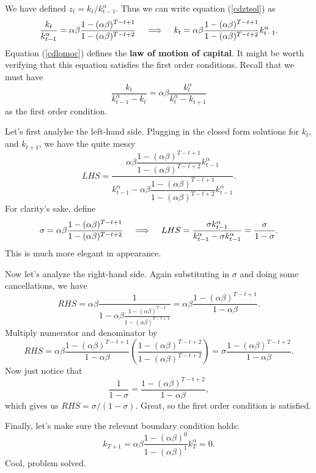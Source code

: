 \documentclass[12pt]{article}
\newcommand{\Lindent}{\hspace{.4cm} \Longrightarrow \hspace{.4cm}}
\theoremstyle{definition}
\begin{document}
We have defined $z_t = k_t / k^{\alpha}_{t-1}$.  Thus we can write equation (\ref{cdztsol}) as 
\begin{equation}
	\frac{k_t}{k^{\alpha}_{t-1}} = 	\alpha \beta\frac{ 1 - (\alpha \beta)^{T -t +1}}{ 1 - (\alpha \beta)^{T -t +2}} \Lindent k_t = \alpha \beta \frac{ 1 - (\alpha \beta)^{T -t +1}}{ 1 - (\alpha \beta)^{T -t +2}}k^{\alpha}_{t-1}. \label{cdlomoc} 
\end{equation}
Equation (\ref{cdlomoc}) defines the \textbf{law of motion of capital}. It might be worth verifying that this equation satisfies the first order conditions. Recall that we must have
	\[\frac{k_t}{k_{t-1}^{\alpha} - k_t}= \alpha \beta \frac{ k_t^{\alpha}}{k_t^{\alpha} - k_{t+1}}	\]
as the first order condition.

Let's first analylse the left-hand side. Plugging in the closed form solutions for $k_t$, and $k_{t+1}$, we have the quite messy
	\[LHS = \dfrac{ \alpha \beta \dfrac{ 1 - (\alpha \beta)^{T -t +1}}{ 1 - (\alpha \beta)^{T -t +2}}k^{\alpha}_{t-1}}{k_{t-1}^{\alpha} -  \alpha \beta\dfrac{ 1 - (\alpha \beta)^{T -t +1}}{ 1 - (\alpha \beta)^{T -t +2}}k^{\alpha}_{t-1}}.\]
For clarity's sake, define 
	\[ \sigma = \alpha \beta \frac{ 1 - (\alpha \beta)^{T -t +1}}{ 1 - (\alpha \beta)^{T -t +2}} \Lindent LHS = \frac{ \sigma k^{\alpha}_{t-1}}{k_{t-1}^{\alpha} -  \sigma k^{\alpha}_{t-1}} = \frac{\sigma}{1 - \sigma}.\]
This is much more elegant in appearance.

Now let's analyze the right-hand side. Again substituting in $\sigma$ and doing some cancellations, we have
	\[	RHS = \alpha \beta \frac{1}{1 - \alpha \beta \frac{ 1 - (\alpha \beta)^{T -t}}{ 1 - (\alpha \beta)^{T -t +1}}} = \alpha \beta \frac{1 - (\alpha \beta)^{T -t +1}}{ 1 - \alpha \beta}.	\]
Multiply numerator and denominator by 
\[	RHS =  \alpha \beta \frac{1 - (\alpha \beta)^{T -t +1}}{ 1 - \alpha \beta} \left( \frac{ 1 - (\alpha \beta)^{T -t +2}}{ 1 - (\alpha \beta)^{T -t +2}} \right) = \sigma \frac{ 1 - (\alpha \beta)^{T -t +2}}{1 - \alpha \beta}.	\]
Now just notice that 
	\[ \frac{1}{1 - \sigma} =   \frac{   1 - (\alpha \beta)^{T -t +2} }{ 1 - \alpha \beta},	\]
which gives us $RHS= \sigma / (1- \sigma)$. Great, so the first order condition is satisfied. 

Finally, let's make sure the relevant boundary condition holds:
\[	 k_{T+1} = \alpha \beta \frac{ 1 - (\alpha \beta)^{0}}{ 1 - (\alpha \beta)^{1}}k^{\alpha}_{T} =0. \]
Cool, problem solved. 
\end{document}
